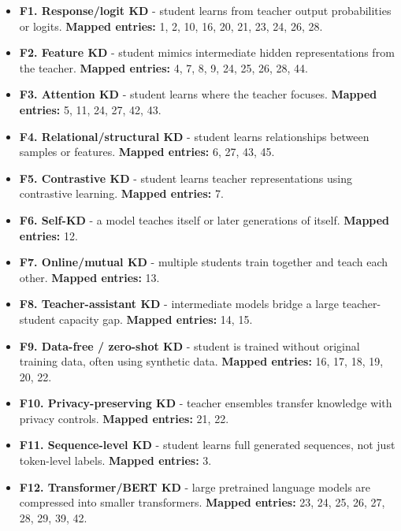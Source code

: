 \documentclass[10pt]{article}
\begin{document}
\begin{itemize}

\item \textbf{F1. Response/logit KD} - student learns from teacher output probabilities or logits. 
\textbf{Mapped entries:} 1, 2, 10, 16, 20, 21, 23, 24, 26, 28.

\item \textbf{F2. Feature KD} - student mimics intermediate hidden representations from the teacher. 
\textbf{Mapped entries:} 4, 7, 8, 9, 24, 25, 26, 28, 44.

\item \textbf{F3. Attention KD} - student learns where the teacher focuses. 
\textbf{Mapped entries:} 5, 11, 24, 27, 42, 43.

\item \textbf{F4. Relational/structural KD} - student learns relationships between samples or features. 
\textbf{Mapped entries:} 6, 27, 43, 45.

\item \textbf{F5. Contrastive KD} - student learns teacher representations using contrastive learning. 
\textbf{Mapped entries:} 7.

\item \textbf{F6. Self-KD} - a model teaches itself or later generations of itself. 
\textbf{Mapped entries:} 12.

\item \textbf{F7. Online/mutual KD} - multiple students train together and teach each other. 
\textbf{Mapped entries:} 13.

\item \textbf{F8. Teacher-assistant KD} - intermediate models bridge a large teacher-student capacity gap. 
\textbf{Mapped entries:} 14, 15.

\item \textbf{F9. Data-free / zero-shot KD} - student is trained without original training data, often using synthetic data. 
\textbf{Mapped entries:} 16, 17, 18, 19, 20, 22.

\item \textbf{F10. Privacy-preserving KD} - teacher ensembles transfer knowledge with privacy controls. 
\textbf{Mapped entries:} 21, 22.

\item \textbf{F11. Sequence-level KD} - student learns full generated sequences, not just token-level labels. 
\textbf{Mapped entries:} 3.

\item \textbf{F12. Transformer/BERT KD} - large pretrained language models are compressed into smaller transformers. 
\textbf{Mapped entries:} 23, 24, 25, 26, 27, 28, 29, 39, 42.


\end{itemize}
\end{document}
